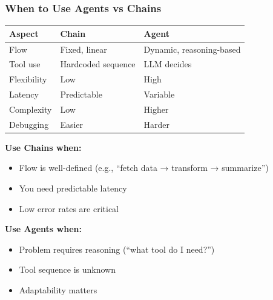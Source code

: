 \documentclass[aspectratio=169,11pt]{beamer}
\begin{document}
\begin{frame}
\frametitle{When to Use Agents vs Chains}

\begin{center}
\begin{tabular}{lll}
\toprule
\textbf{Aspect} & \textbf{Chain} & \textbf{Agent} \\
\midrule
Flow & Fixed, linear & Dynamic, reasoning-based \\
Tool use & Hardcoded sequence & LLM decides \\
Flexibility & Low & High \\
Latency & Predictable & Variable \\
Complexity & Low & Higher \\
Debugging & Easier & Harder \\
\bottomrule
\end{tabular}
\end{center}

\vspace{0.5cm}

\textbf{Use Chains when:}
\begin{itemize}
  \item Flow is well-defined (e.g., ``fetch data → transform → summarize'')
  \item You need predictable latency
  \item Low error rates are critical
\end{itemize}

\textbf{Use Agents when:}
\begin{itemize}
  \item Problem requires reasoning (``what tool do I need?'')
  \item Tool sequence is unknown
  \item Adaptability matters
\end{itemize}

\end{frame}
\end{document}
